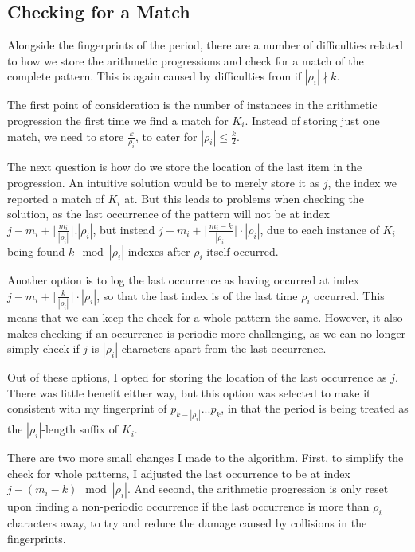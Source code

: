 \documentclass[ %
                    author={Dominic Joseph Moylett},
                    degree={MEng},
                     title={Dictionary Matching with Fingerprints},
                  subtitle={An Empirical Analysis},
                      type={research},
                      year={2015} ]{dissertation}
\begin{document}
\subsection{Checking for a Match}

Alongside the fingerprints of the period, there are a number of difficulties related to how we store the arithmetic progressions and check for a match of the complete pattern. This is again caused by difficulties from if $|\rho_i| \nmid k$.

The first point of consideration is the number of instances in the arithmetic progression the first time we find a match for $K_i$. Instead of storing just one match, we need to store $\frac{k}{\rho_i}$, to cater for $|\rho_i| \leq \frac{k}{2}$.

The next question is how do we store the location of the last item in the progression. An intuitive solution would be to merely store it as $j$, the index we reported a match of $K_i$ at. But this leads to problems when checking the solution, as the last occurrence of the pattern will not be at index $j - m_i + \lfloor\frac{m_i}{|\rho_i|}\rfloor.|\rho_i|$, but instead $j - m_i + \lfloor\frac{m_i - k}{|\rho_i|}\rfloor\cdot|\rho_i|$, due to each instance of $K_i$ being found $k \mod |\rho_i|$ indexes after $\rho_i$ itself occurred.

Another option is to log the last occurrence as having occurred at index $j - m_i + \lfloor\frac{k}{|\rho_i|}\rfloor\cdot|\rho_i|$, so that the last index is of the last time $\rho_i$ occurred. This means that we can keep the check for a whole pattern the same. However, it also makes checking if an occurrence is periodic more challenging, as we can no longer simply check if $j$ is $|\rho_i|$ characters apart from the last occurrence.

Out of these options, I opted for storing the location of the last occurrence as $j$. There was little benefit either way, but this option was selected to make it consistent with my fingerprint of $p_{k - |\rho_i|}...p_k$, in that the period is being treated as the $|\rho_i|$-length suffix of $K_i$.

There are two more small changes I made to the algorithm. First, to simplify the check for whole patterns, I adjusted the last occurrence to be at index $j - (m_i - k) \mod |\rho_i|$. And second, the arithmetic progression is only reset upon finding a non-periodic occurrence if the last occurrence is more than $\rho_i$ characters away, to try and reduce the damage caused by collisions in the fingerprints.
\end{document}
